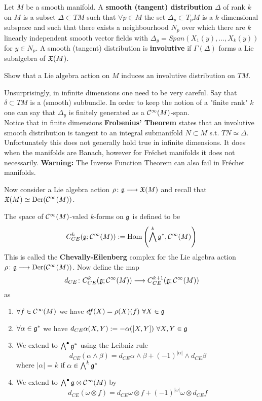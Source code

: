 \begin{definition}
  Let $M$ be a smooth manifold. A \textbf{smooth (tangent) distribution} $\Delta$ of rank $k$ on $M$ is a subset $\Delta \subset TM$ such that $\forall p \in M$ the set $\Delta_p \subset T_p M$ is a $k$-dimensional subspace and such that there exists a neighbourhood $N_p$ over which there are $k$ linearly independent smooth vector fields with $\Delta_y = Span(X_1(y), ..., X_k(y))$ for $y \in N_p$. A smooth (tangent) distribution is \textbf{involutive} if $\Gamma(\Delta)$ forms a Lie subalgebra of $\mathfrak{X}(M)$.
\end{definition}

\begin{ex}
  Show that a Lie algebra action on $M$ induces an involutive distribution on $TM$.
\end{ex}

\begin{rem}
  Unsurprisingly, in infinite dimensions one need to be very careful. Say that $\delta \subset TM$ is a (smooth) subbundle. In order to keep the notion of a "finite rank" $k$ one can say that $\Delta_y$ is finitely generated as a $\mathcal{C}^{\infty}(M)$-span.\\
  Notice that in finite dimensions \textbf{Frobenius' Theorem} states that an involutive smooth distribution is tangent to an integral submanifold $N \subset M$ s.t. $TN \simeq \Delta$. Unfortunately this does not generally hold true in infinite dimensions. It does when the manifolds are Banach, however for Fréchet manifolds it does not necessarily. \textbf{Warning:} The Inverse Function Theorem can also fail in Fréchet manifolds.
\end{rem}

Now consider a Lie algebra action $\rho \colon \mathfrak{g} \longrightarrow \mathfrak{X}(M)$ and recall that $\mathfrak{X}(M) \simeq \operatorname{Der}(\mathcal{C}^{\infty}(M))$.

\begin{definition}
  The space of $\mathcal{C}^{\infty}(M)$-valed $k$-forms on $\mathfrak{g}$ is defined to be
  $$ C^k_{CE}(\mathfrak{g} ; \mathcal{C}^{\infty}(M)) := \operatorname{Hom}\left(\bigwedge^k \mathfrak{g}^*, \mathcal{C}^{\infty}(M)\right) $$
  This is called the \textbf{Chevally-Eilenberg} complex for the Lie algebra action $\rho \colon \mathfrak{g} \longrightarrow \operatorname{Der}(\mathcal{C}^{\infty}(M))$. Now define the map
  $$ d_{CE} \colon C^k_{CE}(\mathfrak{g} ; \mathcal{C}^{\infty}(M)) \longrightarrow C^{k+1}_{CE}(\mathfrak{g} ; \mathcal{C}^{\infty}(M)) $$
  as
  \begin{enumerate}
    \item $\forall f\in \mathcal{C}^{\infty}(M)$ we have $df(X)= \rho(X)(f) \ \forall X \in \mathfrak{g}$
    \item $\forall \alpha \in \mathfrak{g}^*$ we have $d_{CE}\alpha(X,Y) := - \alpha([X,Y]) \ \forall X,Y \in \gf$
    \item We extend to $\bigwedge^\bullet \mathfrak{g}^*$ using the Leibniz rule
    $$ d_{CE} (\alpha \wedge \beta) = d_{CE}\alpha \wedge \beta + (-1)^{|\alpha|} \wedge d_{CE} \beta $$
    where $|\alpha| = k$ if $\alpha \in \bigwedge^k\mathfrak{g}^*$
    \item We extend to $\bigwedge^\bullet \mathfrak{g} \otimes \mathcal{C}^{\infty}(M)$ by
    $$ d_{CE}(\omega \otimes f) = d_{CE} \omega \otimes f + (-1)^{|\omega|} \omega \otimes d_{CE} f$$
  \end{enumerate}
\end{definition}

